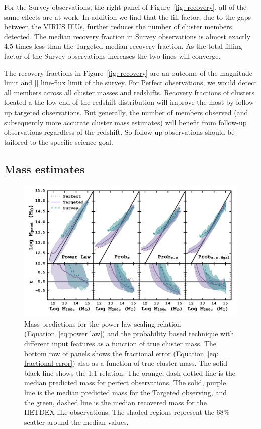 \documentclass[fleqn,usenatbib]{mnras}
\begin{document}
For the Survey observations, the right panel of Figure~\ref{fig: recovery}, all of the same effects are at work. In addition we find that the fill factor, due to the gaps between the VIRUS IFUs, further reduces the number of cluster members detected. The median recovery fraction in Survey observations is almost exactly 4.5 times less than the Targeted median recovery fraction. As the total filling factor of the Survey observations increases the two lines will converge.

The recovery fractions in Figure~\ref{fig: recovery} are an outcome of the magnitude limit and [] line-flux limit of the survey. For Perfect observations, we would detect all members across all cluster masses and redshifts. Recovery fractions of clusters located a the low end of the redshift distribution will improve the most by follow-up targeted observations. But generally, the number of members observed (and subsequently more accurate cluster mass estimates) will benefit from follow-up observations regardless of the redshift. So follow-up observations should be tailored to the specific science goal.

\subsection{Mass estimates}
\begin{figure} 
	\includegraphics[width=\textwidth]{figures/Probcomparison.pdf} 
	\caption[Probability based cluster mass predictions.]{Mass predictions for the power law scaling relation (Equation~\ref{eq:power law}) and the probability based technique with different input features as a function of true cluster mass. The bottom row of panels shows the fractional error (Equation~\ref{eq: fractional error}) also as a function of true cluster mass. The solid black line shows the 1:1 relation. The orange, dash-dotted line is the median predicted mass for perfect observations. The solid, purple line is the median predicted mass for the Targeted observing, and the green, dashed line is the median recovered mass for the HETDEX-like observations. The shaded regions represent the 68\% scatter around the median values.}
	\label{fig:Probability comparison} 
\end{figure}
\end{document}

